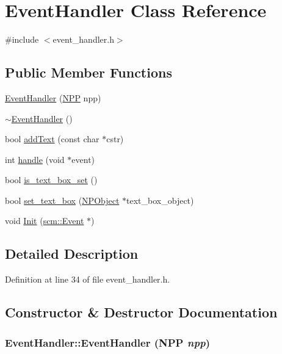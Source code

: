 \hypertarget{class_event_handler}{
\section{EventHandler Class Reference}
\label{class_event_handler}
}


{\ttfamily \#include $<$event\_\-handler.h$>$}

\subsection*{Public Member Functions}
\begin{DoxyCompactItemize}
\item 
\hyperlink{class_event_handler_a6b7f9af8b5c3c4128047d35467ca0da0}{EventHandler} (\hyperlink{struct___n_p_p}{NPP} npp)
\item 
\hyperlink{class_event_handler_a3decb8cd88ba8af2b9b0b0f0f2fcd722}{$\sim$EventHandler} ()
\item 
bool \hyperlink{class_event_handler_a18771c6be120edf9d912a4003066b8b3}{addText} (const char $\ast$cstr)
\item 
int \hyperlink{class_event_handler_a2fcafd6f528017d8a814f9c384e2e057}{handle} (void $\ast$event)
\item 
bool \hyperlink{class_event_handler_a2f334e3eb39be72751e342619489e695}{is\_\-text\_\-box\_\-set} ()
\item 
bool \hyperlink{class_event_handler_aa09c0b995aa6c774d4a33be13be0cbf2}{set\_\-text\_\-box} (\hyperlink{struct_n_p_object}{NPObject} $\ast$text\_\-box\_\-object)
\item 
void \hyperlink{class_event_handler_a67d149352861c0a8fe603a14585d1003}{Init} (\hyperlink{classscm_1_1_event}{scm::Event} $\ast$)
\end{DoxyCompactItemize}


\subsection{Detailed Description}


Definition at line 34 of file event\_\-handler.h.



\subsection{Constructor \& Destructor Documentation}
\hypertarget{class_event_handler_a6b7f9af8b5c3c4128047d35467ca0da0}{
\subsubsection[{EventHandler}]{\setlength{\rightskip}{0pt plus 5cm}EventHandler::EventHandler ({\bf NPP} {\em npp})}}
\label{class_event_handler_a6b7f9af8b5c3c4128047d35467ca0da0}


